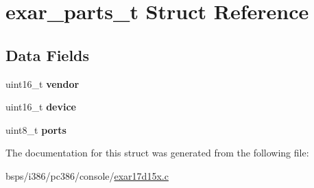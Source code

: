 \hypertarget{structexar__parts__t}{}\section{exar\+\_\+parts\+\_\+t Struct Reference}
\label{structexar__parts__t}
\subsection*{Data Fields}
\begin{DoxyCompactItemize}
\item 
\mbox{\label{structexar__parts__t_aeb91a7bdeab59feb6b20be22ca5ee2e3}} 
uint16\+\_\+t {\bfseries vendor}
\item 
\mbox{\label{structexar__parts__t_a5121dc00332420c8e33998e3ef8a4486}} 
uint16\+\_\+t {\bfseries device}
\item 
\mbox{\label{structexar__parts__t_af576381baf1fa9cfed69c5d25dcea9ed}} 
uint8\+\_\+t {\bfseries ports}
\end{DoxyCompactItemize}


The documentation for this struct was generated from the following file\+:\begin{DoxyCompactItemize}
\item 
bsps/i386/pc386/console/\mbox{\hyperlink{exar17d15x_8c}{exar17d15x.\+c}}\end{DoxyCompactItemize}
